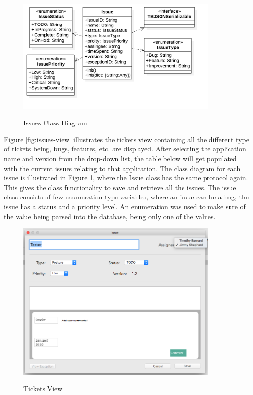 \begin{figure}[!h]
    \caption{Issues Class Diagram}
    \centering
    \includegraphics[width=100mm]{images/classdiagrams/Issues}
    \label{fig:issues-cd}
\end{figure} 

Figure \ref{fig:issues-view} illustrates the tickets view containing all the different type of tickets being, bugs, features, etc. are displayed. After selecting the application name and version from the drop-down list, the table below will get populated with the current issues relating to that application. The class diagram for each issue is illustrated in Figure \ref{fig:issues-cd}, where the Issue class has the same protocol again. This gives the class functionality to save and retrieve all the issues. The issue class consists of few enumeration type variables, where an issue can be a bug, the issue has a status and a priority level. An enumeration was used to make sure of the value being parsed into the database, being only one of the values.

\begin{figure}[!h]
    \caption{Tickets View}
    \centering
    \includegraphics[width=100mm]{images/dashboard/edit_issue}
    \label{fig:edit_issue-view}
\end{figure} 


